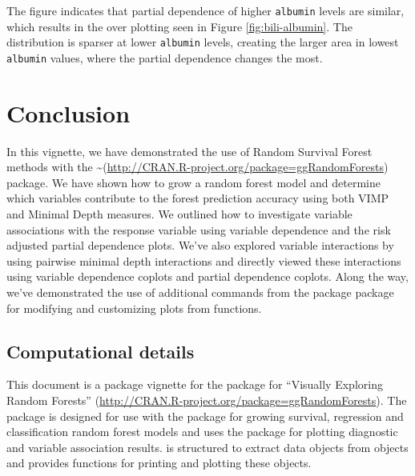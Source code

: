 \documentclass[article]{jss}
\begin{document}
The figure indicates that partial dependence of higher \texttt{albumin}
levels are similar, which results in the over plotting seen in Figure
\ref{fig:bili-albumin}. The distribution is sparser at lower
\texttt{albumin} levels, creating the larger area in lowest
\texttt{albumin} values, where the partial dependence changes the most.

\section{Conclusion}\label{conclusion}

In this vignette, we have demonstrated the use of Random Survival Forest
methods with the
\textasciitilde{}(\url{http://CRAN.R-project.org/package=ggRandomForests})
package. We have shown how to grow a random forest model and determine
which variables contribute to the forest prediction accuracy using both
VIMP and Minimal Depth measures. We outlined how to investigate variable
associations with the response variable using variable dependence and
the risk adjusted partial dependence plots. We've also explored variable
interactions by using pairwise minimal depth interactions and directly
viewed these interactions using variable dependence coplots and partial
dependence coplots. Along the way, we've demonstrated the use of
additional commands from the  package
\citep[\url{http://CRAN.R-project.org/package=ggplot2}]{Wickham:2009}
package for modifying and customizing plots from 
functions.

\subsection{Computational details}\label{computational-details}

This document is a package vignette for the 
package for ``Visually Exploring Random Forests''
(\url{http://CRAN.R-project.org/package=ggRandomForests}). The
 package is designed for use with the
 package
\citep[\url{http://CRAN.R-project.org/package=randomForestSRC}]{Ishwaran:RFSRC:2014}
for growing survival, regression and classification random forest models
and uses the  package
\citep[\url{http://CRAN.R-project.org/package=ggplot2}]{Wickham:2009}
for plotting diagnostic and variable association results.
 is structured to extract data objects from
 objects and provides functions for printing and
plotting these objects.
\end{document}
